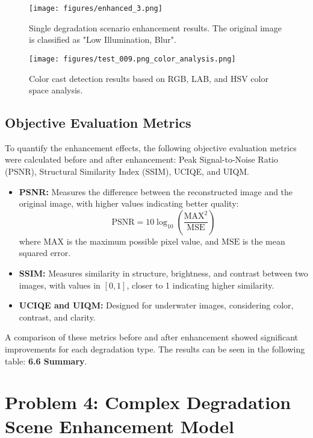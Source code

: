 \documentclass{apmcmthesis}
\begin{document}
\begin{figure}[!ht]
    \centering
    \texttt{[image: figures/enhanced\_3.png]}
    \caption{ Single degradation scenario enhancement results. The original image is classified as "Low Illumination, Blur".}
    \label{fig:example_4}
\end{figure}

\begin{figure}[!ht]
    \centering
    \texttt{[image: figures/test\_009.png\_color\_analysis.png]}
    \caption{ Color cast detection results based on RGB, LAB, and HSV color space analysis.}
    \label{fig:example_5}
\end{figure}

\subsection{Objective Evaluation Metrics}
To quantify the enhancement effects, the following objective evaluation metrics were calculated before and after enhancement: Peak Signal-to-Noise Ratio (PSNR), Structural Similarity Index (SSIM), UCIQE, and UIQM.

\begin{itemize}
    \item \textbf{PSNR:} Measures the difference between the reconstructed image and the original image, with higher values indicating better quality:
    \[
    \text{PSNR} = 10 \log_{10} \left( \frac{\text{MAX}^2}{\text{MSE}} \right)
    \]
    where $\text{MAX}$ is the maximum possible pixel value, and $\text{MSE}$ is the mean squared error.

    \item \textbf{SSIM:} Measures similarity in structure, brightness, and contrast between two images, with values in $[0,1]$, closer to 1 indicating higher similarity.

    \item \textbf{UCIQE and UIQM:} Designed for underwater images, considering color, contrast, and clarity.
\end{itemize}

A comparison of these metrics before and after enhancement showed significant improvements for each degradation type. The results can be seen in the following table: \textbf{6.6 Summary}.

\section{Problem 4: Complex Degradation Scene Enhancement Model}
\end{document}
